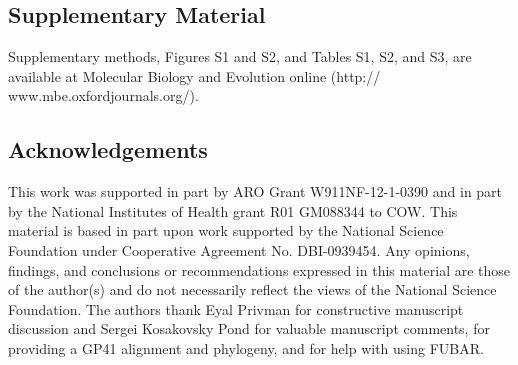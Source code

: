 \documentclass[11pt]{article}
\begin{document}
\subsection*{Supplementary Material}
Supplementary methods, Figures S1 and S2, and Tables S1, S2, and S3, are available at Molecular Biology and Evolution online (http:// www.mbe.oxfordjournals.org/).


\subsection*{Acknowledgements}
This work was supported in part by ARO Grant W911NF-12-1-0390 and in part by the National Institutes of Health grant R01 GM088344 to COW. This material is based in part upon work supported by the National Science Foundation under Cooperative Agreement No. DBI-0939454. Any opinions, findings, and conclusions or recommendations expressed in this material are those of the author(s) and do not necessarily reflect the views of the National Science Foundation. The authors thank Eyal Privman for constructive manuscript discussion and Sergei Kosakovsky Pond for valuable manuscript comments, for providing a GP41 alignment and phylogeny, and for help with using FUBAR.



	

\newpage
\end{document}
